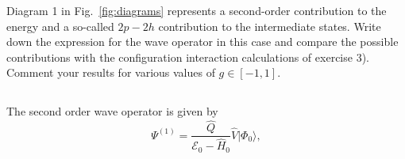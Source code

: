 Diagram 1 in Fig.~\ref{fig:diagrams} represents a second-order contribution to the energy and a so-called $2p-2h$ contribution to the intermediate states.
Write down the expression for the wave operator in this case and compare the possible contributions with the configuration interaction calculations of exercise 3). %
Comment your results for various values of $g \in [-1,1]$.

\subsection{}
The second order wave operator is given by
\begin{equation*}
    \Psi^{(1)} = \frac{\hat{Q}}{\mathcal{E}_0 - \hat{H}_0} \hat{V} \vert \Phi_0 \rangle,
\end{equation*}
